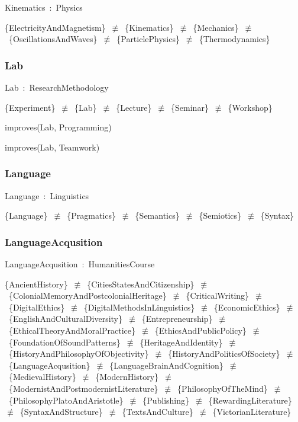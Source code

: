 \documentclass{article}
\begin{document}
Kinematics~:~Physics

\{ElectricityAndMagnetism\}~\ensuremath{\not\equiv}~\{Kinematics\}~\ensuremath{\not\equiv}~\{Mechanics\}~\ensuremath{\not\equiv}~\{OscillationsAndWaves\}~\ensuremath{\not\equiv}~\{ParticlePhysics\}~\ensuremath{\not\equiv}~\{Thermodynamics\}

\subsubsection*{Lab}

Lab~:~ResearchMethodology

\{Experiment\}~\ensuremath{\not\equiv}~\{Lab\}~\ensuremath{\not\equiv}~\{Lecture\}~\ensuremath{\not\equiv}~\{Seminar\}~\ensuremath{\not\equiv}~\{Workshop\}

improves(Lab, Programming)

improves(Lab, Teamwork)

\subsubsection*{Language}

Language~:~Linguistics

\{Language\}~\ensuremath{\not\equiv}~\{Pragmatics\}~\ensuremath{\not\equiv}~\{Semantics\}~\ensuremath{\not\equiv}~\{Semiotics\}~\ensuremath{\not\equiv}~\{Syntax\}

\subsubsection*{LanguageAcqusition}

LanguageAcqusition~:~HumanitiesCourse

\{AncientHistory\}~\ensuremath{\not\equiv}~\{CitiesStatesAndCitizenship\}~\ensuremath{\not\equiv}~\{ColonialMemoryAndPostcolonialHeritage\}~\ensuremath{\not\equiv}~\{CriticalWriting\}~\ensuremath{\not\equiv}~\{DigitalEthics\}~\ensuremath{\not\equiv}~\{DigitalMethodsInLinguistics\}~\ensuremath{\not\equiv}~\{EconomicEthics\}~\ensuremath{\not\equiv}~\{EnglishAndCulturalDiversity\}~\ensuremath{\not\equiv}~\{Entrepreneurship\}~\ensuremath{\not\equiv}~\{EthicalTheoryAndMoralPractice\}~\ensuremath{\not\equiv}~\{EthicsAndPublicPolicy\}~\ensuremath{\not\equiv}~\{FoundationOfSoundPatterns\}~\ensuremath{\not\equiv}~\{HeritageAndIdentity\}~\ensuremath{\not\equiv}~\{HistoryAndPhilosophyOfObjectivity\}~\ensuremath{\not\equiv}~\{HistoryAndPoliticsOfSociety\}~\ensuremath{\not\equiv}~\{LanguageAcqusition\}~\ensuremath{\not\equiv}~\{LanguageBrainAndCognition\}~\ensuremath{\not\equiv}~\{MedievalHistory\}~\ensuremath{\not\equiv}~\{ModernHistory\}~\ensuremath{\not\equiv}~\{ModernistAndPostmodernistLiterature\}~\ensuremath{\not\equiv}~\{PhilosophyOfTheMind\}~\ensuremath{\not\equiv}~\{PhilosophyPlatoAndAristotle\}~\ensuremath{\not\equiv}~\{Publishing\}~\ensuremath{\not\equiv}~\{RewardingLiterature\}~\ensuremath{\not\equiv}~\{SyntaxAndStructure\}~\ensuremath{\not\equiv}~\{TextsAndCulture\}~\ensuremath{\not\equiv}~\{VictorianLiterature\}
\end{document}

